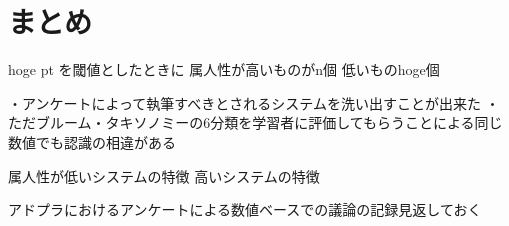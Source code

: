 \section{まとめ}
hoge pt を閾値としたときに
属人性が高いものがn個
低いものhoge個

・アンケートによって執筆すべきとされるシステムを洗い出すことが出来た
・ただブルーム・タキソノミーの6分類を学習者に評価してもらうことによる同じ数値でも認識の相違がある


属人性が低いシステムの特徴
高いシステムの特徴

アドプラにおけるアンケートによる数値ベースでの議論の記録見返しておく
